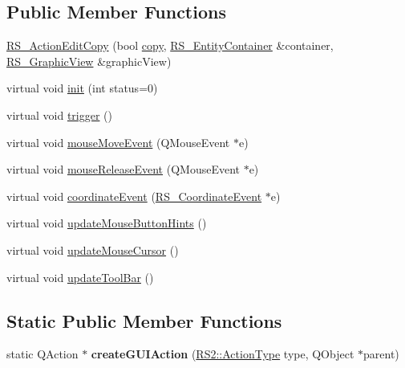 \subsection*{Public Member Functions}
\begin{DoxyCompactItemize}
\item 
\hyperlink{classRS__ActionEditCopy_a58dfa28e5cf4f72d3b501e40b2216dcf}{R\-S\-\_\-\-Action\-Edit\-Copy} (bool \hyperlink{classRS__ActionEditCopy_a7f5523b31820f2ed72a3570a5cedad98}{copy}, \hyperlink{classRS__EntityContainer}{R\-S\-\_\-\-Entity\-Container} \&container, \hyperlink{classRS__GraphicView}{R\-S\-\_\-\-Graphic\-View} \&graphic\-View)
\item 
virtual void \hyperlink{classRS__ActionEditCopy_a012de2fd440bfeb65c09717e75ddfa08}{init} (int status=0)
\item 
virtual void \hyperlink{classRS__ActionEditCopy_a0519d8cd50b43cf75140b66bba23c3b5}{trigger} ()
\item 
virtual void \hyperlink{classRS__ActionEditCopy_a1fea56ce10b501f38caf0d3dd9d4ad17}{mouse\-Move\-Event} (Q\-Mouse\-Event $\ast$e)
\item 
virtual void \hyperlink{classRS__ActionEditCopy_aaba216451732c0852426666d8a32e696}{mouse\-Release\-Event} (Q\-Mouse\-Event $\ast$e)
\item 
virtual void \hyperlink{classRS__ActionEditCopy_a821e0024f0adf9266784383120aee721}{coordinate\-Event} (\hyperlink{classRS__CoordinateEvent}{R\-S\-\_\-\-Coordinate\-Event} $\ast$e)
\item 
virtual void \hyperlink{classRS__ActionEditCopy_a4282b7735295c7aef63f15601bba2d7e}{update\-Mouse\-Button\-Hints} ()
\item 
virtual void \hyperlink{classRS__ActionEditCopy_a868f95ea25bb1339e8a19172c1b6b945}{update\-Mouse\-Cursor} ()
\item 
virtual void \hyperlink{classRS__ActionEditCopy_a18d4b6e044aa9949bba1c70132aa138d}{update\-Tool\-Bar} ()
\end{DoxyCompactItemize}
\subsection*{Static Public Member Functions}
\begin{DoxyCompactItemize}
\item 
\hypertarget{classRS__ActionEditCopy_a7c712cc2af79d12b8e24d8988fe378a1}{static Q\-Action $\ast$ {\bfseries create\-G\-U\-I\-Action} (\hyperlink{classRS2_afe3523e0bc41fd637b892321cfc4b9d7}{R\-S2\-::\-Action\-Type} type, Q\-Object $\ast$parent)}\label{classRS__ActionEditCopy_a7c712cc2af79d12b8e24d8988fe378a1}

\end{DoxyCompactItemize}
